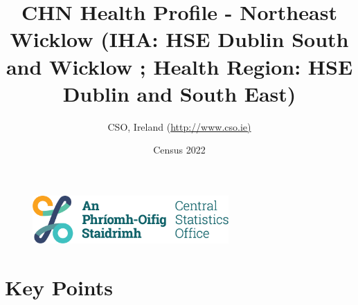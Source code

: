 \documentclass{article}
\title{CHN Health Profile - Northeast Wicklow (IHA: HSE Dublin South and Wicklow ;  Health Region: HSE Dublin and South East) }
\date{Census 2022}
\author{CSO, Ireland  (\url{http://www.cso.ie)}}
\begin{document}


\begin{figure}
	\centering
\includegraphics[width =75mm]{../figures/CSO_Logo.png}
\end{figure}

				 
		   
						  
														  
																																													
												 
			 
\maketitle
					
													   
				 
						 
																																																																											   
				 
				  
  \pagebreak
    	    \tableofcontents

\pagebreak


\section{Key Points}
\end{document}
